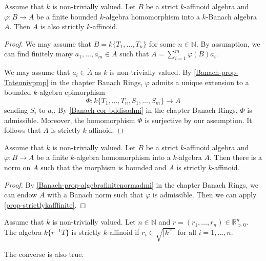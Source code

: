 \begin{proposition}\label{prop-strictlykafffinite}
    Assume that $k$ is non-trivially valued.
    Let $B$ be a strict $k$-affinoid algebra and $\varphi:B\rightarrow A$ be a finite bounded $k$-algebra homomorphism into a $k$-Banach algebra $A$. Then $A$ is also strictly $k$-affinoid.
\end{proposition}
\begin{proof}
    We may assume that $B=k\{T_1,\ldots,T_n\}$ for some $n\in \mathbb{N}$. By assumption, we can find finitely many $a_1,\ldots,a_m\in A$ such that $A=\sum_{i=1}^m \varphi(B)a_i$.

    We may assume that $a_i\in \mathring{A}$ as $k$ is non-trivially valued. By \cref{Banach-prop-Tateunivprop} in the chapter Banach Rings, $\varphi$ admits a unique extension to a bounded $k$-algebra epimorphism 
    \[
        \Phi:  k\{T_1,\ldots,T_n,S_1,\ldots,S_m\}\rightarrow A
    \]
    sending $S_i$ to $a_i$. By \cref{Banach-cor-bddisadmi} in the chapter Banach Rings, $\Phi$ is admissible. Moreover, the homomorphism $\Phi$ is surjective by our assumption. It follows that $A$ is strictly $k$-affinoid.
\end{proof}

\begin{proposition}\label{prop-finiteinduceaffnorm}
    Assume that $k$ is non-trivially valued.
    Let $B$ be a strict $k$-affinoid algebra and $\varphi:B\rightarrow A$ be a finite $k$-algebra homomorphism into a $k$-algebra $A$. Then there is a norm on $A$ such that the morphism is bounded and $A$ is strictly $k$-affinoid.
\end{proposition}
\begin{proof}
    By \cref{Banach-prop-algebrafinitenormadmi} in the chapter Banach Rings, we can endow $A$ with a Banach norm such that $\varphi$ is admissible. Then we can apply \cref{prop-strictlykafffinite}.
\end{proof}

\begin{lemma}\label{lma-tatestrictaff}
    Assume that $k$ is non-trivially valued.
    Let $n\in \mathbb{N}$ and $r=(r_1,\ldots,r_n)\in \mathbb{R}^n_{>0}$. The algebra $k\{r^{-1}T\}$ is strictly $k$-affinoid if $r_i\in \sqrt{|k^{\times}|}$ for all $i=1,\ldots,n$.
\end{lemma}
\begin{remark}
    The converse is also true.     
\end{remark}

